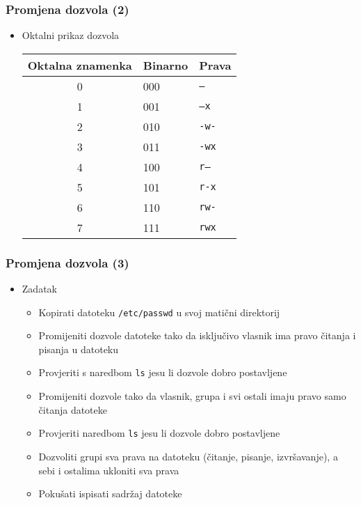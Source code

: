 \documentclass[table,usenames,dvipsnames]{beamer}
\newcommand{\shell}[1]{\texttt{#1}}
\begin{document}
\begin{frame}[t]
\frametitle{Promjena dozvola (2)}
\begin{itemize}
  \item Oktalni prikaz dozvola
  \begin{table}[h]
  \begin{tabular}{|c|l|l|}
    \hline
    \rowcolor{BlueViolet!20}Oktalna znamenka  & Binarno & Prava       \\
    \hline
    0                 & 000     & \shell{---} \\   
    \hline
    1                 & 001     & \shell{--x} \\
    \hline
    2                 & 010     & \shell{-w-} \\
    \hline
    3                 & 011     & \shell{-wx} \\ 
    \hline
    4                 & 100     & \shell{r--} \\
    \hline
    5                 & 101     & \shell{r-x} \\
    \hline
    6                 & 110     & \shell{rw-} \\
    \hline
    7                 & 111     & \shell{rwx} \\ 
    \hline
  \end{tabular}
  \end{table}
\end{itemize}
\end{frame}

\begin{frame}[t]
\frametitle{Promjena dozvola (3)}
\begin{itemize}
  \item Zadatak
  \begin{itemize}
    \item Kopirati datoteku \shell{/etc/passwd} u svoj matični direktorij
    \item Promijeniti dozvole datoteke tako da isključivo vlasnik ima 
          pravo čitanja i pisanja u datoteku
    \item Provjeriti s naredbom \shell{ls} jesu li dozvole dobro 
          postavljene
    \item Promijeniti dozvole tako da vlasnik, grupa i svi ostali imaju 
          pravo samo čitanja datoteke
    \item Provjeriti naredbom \shell{ls} jesu li dozvole dobro postavljene
    \item Dozvoliti grupi sva prava na datoteku (čitanje, pisanje, 
          izvršavanje), a sebi i ostalima ukloniti sva prava
    \item Pokušati ispisati sadržaj datoteke
  \end{itemize}
\end{itemize}
\end{frame}
\end{document}
